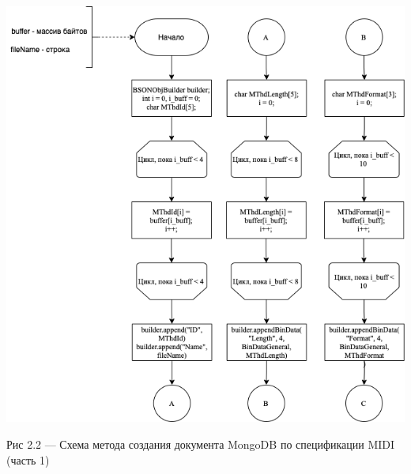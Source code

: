 \begin{center}
		\includegraphics[scale=0.7]{tex/img/Parser1.png}
		
			Рис 2.2 — Схема метода создания документа MongoDB по спецификации MIDI (часть 1)
\end{center}

